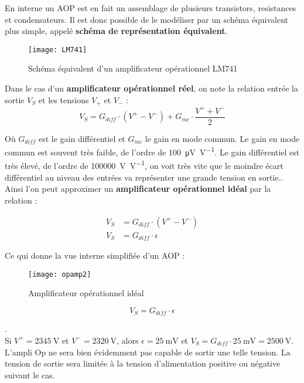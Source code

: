 En interne un AOP est en fait un assemblage de plusieurs transistors, resistances et condensateurs. 
Il est donc possible de le modéliser par un schéma équivalent plus simple, 
appelé \textbf{schéma de représentation équivalent}.
\begin{figure}[H]
    \centering
    \texttt{[image: LM741]}
    \caption{
        Schéma équivalent d'un amplificateur opérationnel LM741
    }
    \label{fig:opamp-equivalent}
\end{figure}

Dans le cas d'un \textbf{amplificateur opérationnel r\'eel}, on note la relation entrée
la sortie \(V_S\) et les tensions \(V_+\) et \(V_-\) :
\[
    V_S=G_{diff}\cdot\left(V^{+}-V^{-}\right)+G_{mc}\cdot\frac{V^{+}+V^{-}}{2}
\]

O\`u \(G_{diff}\) est le gain différentiel et \(G_{mc}\) le gain en mode commun.
Le gain en mode commun est souvent tr\`es faible, de l'ordre de \SI{100}{\micro\volt\per\volt}.
Le gain différentiel est tr\`es élevé, de l'ordre de \SI{100000}{\volt\per\volt}, 
on voit très vite que le moindre écart différentiel au niveau des entrées va 
représenter une grande tension en sortie..
Ainsi l'on peut approximer un \textbf{amplificateur opérationnel idéal} par la relation :

\begin{align*}
    V_S&=G_{diff}\cdot\left(V^{+}-V^{-}\right)\\
    V_S&=G_{diff}\cdot\epsilon
\end{align*}

Ce qui donne la vue interne simplifiée d'un AOP :\\
\begin{minipage}{0.79\textwidth}
    \begin{figure}[H]
        \centering
        \texttt{[image: opamp2]}
        \caption{Amplificateur opérationnel idéal}
        \label{fig:opamp-ideal}
    \end{figure}
\end{minipage}
\begin{minipage}{0.2\textwidth}
    \[
        V_{S}=G_{diff}\cdot\epsilon
    \]
\end{minipage}

\begin{example}.\\
    Si \(V^+=\SI{2345}{\volt}\) et \(V^-=\SI{2320}{\volt}\), alors \(\epsilon=\SI{25}{\milli\volt}\) et 
    \(V_S=G_{diff}\cdot\SI{25}{\milli\volt} = \SI{2500}{\volt}\).\\
    L'ampli Op ne sera bien évidemment pas capable de sortir une telle tension.
    La tension de sortie sera limitée à la tension d'alimentation positive ou
    négative suivant le cas.
\end{example}

